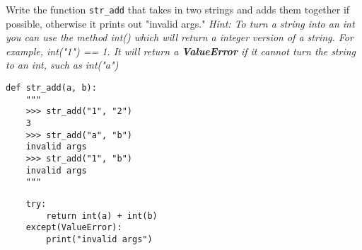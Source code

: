 \begin{blocksection}
\question Write the function \lstinline{str_add} that takes in two strings and adds them together if possible, otherwise it prints out "invalid args." \textit{Hint: To turn a string into an int you can use the method int() which will return a integer version of a string.  For example, int("1") == 1.  It will return a \textbf{ValueError} if it cannot turn the string to an int, such as int("a")}

\begin{lstlisting}
def str_add(a, b):
    """
    >>> str_add("1", "2")
    3
    >>> str_add("a", "b")
    invalid args
    >>> str_add("1", "b")
    invalid args
    """
\end{lstlisting}
\begin{solution}
\begin{lstlisting}
    try:
        return int(a) + int(b)
    except(ValueError):
        print("invalid args")
\end{lstlisting}
\end{solution}
\end{blocksection}